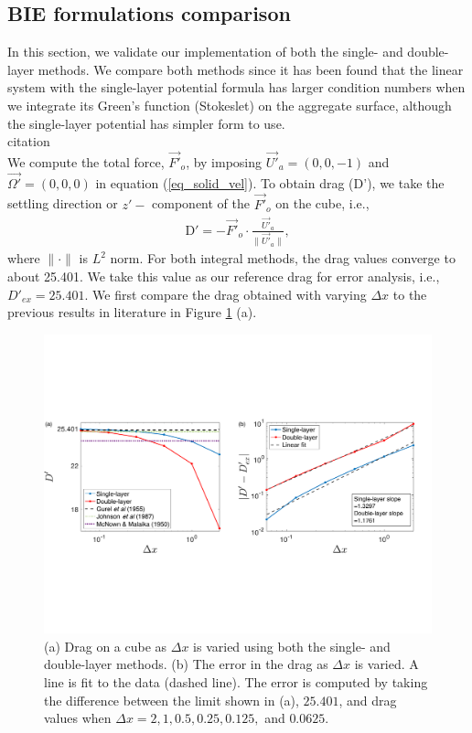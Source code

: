 \subsection{BIE formulations comparison}
In this section, we validate our implementation of both the single- and double-layer methods. We compare both methods since it has been found that the linear system with the single-layer potential formula has larger condition numbers when we integrate its Green's function (Stokeslet) on the aggregate surface, although the single-layer potential has simpler form to use. 
\\
{\color{red}citation}
\\
We compute the total force, $ \vec{F'}_o$, by imposing $\vec{U'}_a = (0,0,-1)$ and $\vec{\Omega'} = (0,0,0)$ in equation (\ref{eq_solid_vel}). To obtain drag (D'), we take the settling direction or $z'-$ component of the $ \vec{F'}_o$ on the cube, i.e., 
\begin{align}
	\text{D}' = - \vec{F'}_o\cdot \frac{\vec{U'}_a}{\| \vec{U'}_a\|},
\end{align}
where $\| \cdot \|$ is $L^2$ norm.
For both integral methods, the drag values converge to about 25.401. We take this value as our reference drag for error analysis, i.e., $D'_{ex} = 25.401.$
We first compare the drag obtained with varying $\Delta x$ to the previous results in literature in Figure \ref{fig_drag_compare} (a).
\begin{figure}[ht]
	\begin{center}
		\vspace{0.2cm}
		
		\includegraphics[scale=0.45]{figures/fig_compare_drag_error}
		\vspace{0.2cm}
	
	\caption{(a) Drag on a cube as $\Delta x$ is varied using both the single- and double-layer methods. (b) The error in the drag as $\Delta x$ is varied. A line is fit to the data (dashed line). The error is computed by taking the difference between the limit shown in (a), $25.401$, and drag values when $\Delta x = 2, 1, 0.5,   0.25,  0.125,$ and $0.0625$.}
	\label{fig_drag_compare}
\end{center}
\end{figure}
